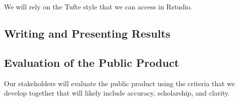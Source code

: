 \documentclass{article}\usepackage[]{graphicx}\usepackage[]{color}
\begin{document}
We will rely on the Tufte style that we can access in Rstudio. 

\subsection{Writing and Presenting Results}

\subsection{Evaluation of the Public Product}

Our stakeholders will evaluate the public product using the criteria that we develop together that will likely include accuracy, scholarship, and clarity. 
\end{document}
